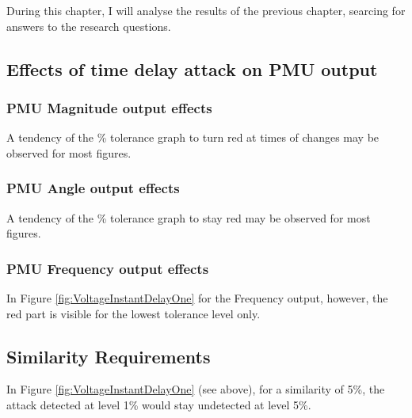 During this chapter, I will analyse the results of the previous chapter, searcing for answers to the research questions.

\subsection{Effects of time delay attack on PMU output}

\subsubsection{PMU Magnitude output effects}
A tendency of the \% tolerance graph to turn red at times of changes may be observed for most figures.

\subsubsection{PMU Angle output effects}

A tendency of the \% tolerance graph to stay red may be observed for most figures.


\subsubsection{PMU Frequency output effects}
In Figure \ref{fig:VoltageInstantDelayOne} for the Frequency output, however, the red part is visible for the lowest tolerance level only.
\subsection{Similarity Requirements}
In Figure \ref{fig:VoltageInstantDelayOne} (see above), for a similarity of 5\%, the attack detected  at level 1\% would stay undetected at level 5\%. 